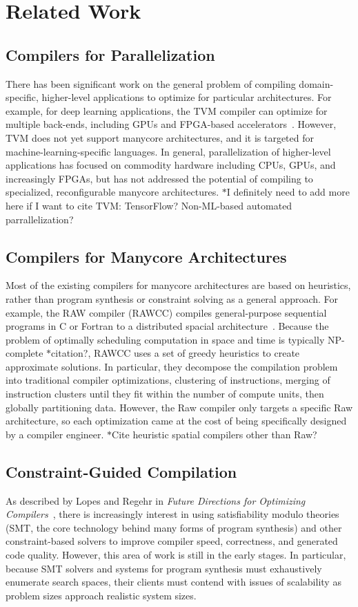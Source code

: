 \documentclass{sig-alternate-05-2015}
\newcommand{\note}{\color{red}$*$}
\begin{document}
\section{Related Work}

\subsection{Compilers for Parallelization}
There has been significant work on the general problem of compiling domain-specific, higher-level applications to optimize for particular architectures. For example, for deep learning applications, the TVM compiler can optimize for multiple back-ends, including GPUs and FPGA-based accelerators~\cite{tvm}. However, TVM does not yet support manycore architectures, and it is targeted for machine-learning-specific languages. In general, parallelization of higher-level applications has focused on commodity hardware including CPUs, GPUs, and increasingly FPGAs, but has not addressed the potential of compiling to specialized, reconfigurable manycore architectures. 
{\note I definitely need to add more here if I want to cite TVM: TensorFlow? Non-ML-based automated parrallelization?}

\subsection{Compilers for Manycore Architectures}
Most of the existing compilers for manycore architectures are based on heuristics, rather than program synthesis or constraint solving as a general approach. For example, the RAW compiler (RAWCC) compiles general-purpose sequential programs in C or Fortran to a distributed spacial architecture~\cite{raw}. Because the problem of optimally scheduling computation in space and time is typically NP-complete {\note citation?}, RAWCC uses a set of greedy heuristics to create approximate solutions. In particular, they decompose the compilation problem into traditional compiler optimizations, clustering of instructions, merging of instruction clusters until they fit within the number of compute units, then globally partitioning data. However, the Raw compiler only targets a specific Raw architecture, so each optimization came at the cost of being specifically designed by a compiler engineer. {\note Cite heuristic spatial compilers other than Raw?}

\subsection{Constraint-Guided Compilation}
As described by Lopes and Regehr in \emph{Future Directions for Optimizing Compilers}~\cite{future}, there is increasingly interest in using satisfiability modulo theories (SMT, the core technology behind many forms of program synthesis) and other constraint-based solvers to improve compiler speed, correctness, and generated code quality. However, this area of work is still in the early stages. In particular, because SMT solvers and systems for program synthesis must exhaustively enumerate search spaces, their clients must contend with issues of scalability as problem sizes approach realistic system sizes. 
\end{document}
